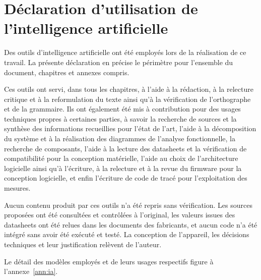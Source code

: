 \chapter*{Déclaration d'utilisation de l'intelligence artificielle}

Des outils d'intelligence artificielle ont été employés lors de la réalisation de ce travail. La présente déclaration en précise le périmètre pour l'ensemble du document, chapitres et annexes compris.

Ces outils ont servi, dans tous les chapitres, à l'aide à la rédaction, à la relecture critique et à la reformulation du texte ainsi qu'à la vérification de l'orthographe et de la grammaire. Ils ont également été mis à contribution pour des usages techniques propres à certaines parties, à savoir la recherche de sources et la synthèse des informations recueillies pour l'état de l'art, l'aide à la décomposition du système et à la réalisation des diagrammes de l'analyse fonctionnelle, la recherche de composants, l'aide à la lecture des datasheets et la vérification de compatibilité pour la conception matérielle, l'aide au choix de l'architecture logicielle ainsi qu'à l'écriture, à la relecture et à la revue du firmware pour la conception logicielle, et enfin l'écriture de code de tracé pour l'exploitation des mesures.

Aucun contenu produit par ces outils n'a été repris sans vérification. Les sources proposées ont été consultées et contrôlées à l'original, les valeurs issues des datasheets ont été relues dans les documents des fabricants, et aucun code n'a été intégré sans avoir été exécuté et testé. La conception de l'appareil, les décisions techniques et leur justification relèvent de l'auteur.

Le détail des modèles employés et de leurs usages respectifs figure à l'annexe~\ref{ann:ia}.
